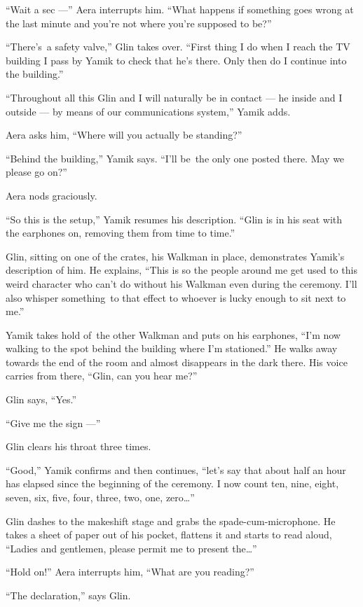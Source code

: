 \documentclass[twoside,11pt,openany]{book}
\begin{document}
``Wait a sec ---'' Aera interrupts him. ``What happens if something goes wrong
at the last minute and you're not where you're supposed to be?''

``There's~a safety valve,'' Glin takes over. ``First thing I do when I reach the
TV building I pass by Yamik to check that he's there. Only then do I continue into the building.''

``Throughout all this Glin and I will naturally be in contact --- he inside and I outside ---  by means of
our communications system,'' Yamik adds.

Aera asks him, ``Where will you actually be standing?''

``Behind the building,'' Yamik says. ``I'll be~the only one posted
there.  May we please go on?''

Aera nods graciously.

``So this is the setup,'' Yamik resumes his description. ``Glin is in his seat
with the earphones on, removing them from time to time.''

Glin, sitting on one of the crates, his Walkman in place, demonstrates Yamik's description of him. He explains,
``This is so the{ }people around me get used to this weird
character who can't do without his Walkman even during the ceremony. I'll also whisper something~to that effect to
whoever is lucky enough to sit next to me.''

Yamik takes hold of~the other Walkman and puts on his earphones, ``I'm now walking to the spot behind the
building where I'm stationed.'' He walks away towards the end of the room and almost disappears in the
dark there. His voice carries from there, ``Glin, can you hear me?''

Glin says, ``Yes.''

``Give me the sign ---''

Glin clears his throat three times.

``Good,'' Yamik confirms and then continues, ``let's say that about half an hour
has elapsed since the beginning of the ceremony. I now count ten, nine, eight, seven, six, five, four, three, two, one,
zero{\ldots}''

Glin dashes to the makeshift stage and grabs the{ }spade-cum-microphone. He takes a sheet of paper out
of his pocket, flattens it and starts to read aloud, ``Ladies and gentlemen, please permit me to present
the{\ldots}''

``Hold on!'' Aera interrupts him, ``What are you reading?''

``The declaration,'' says Glin.
\end{document}
